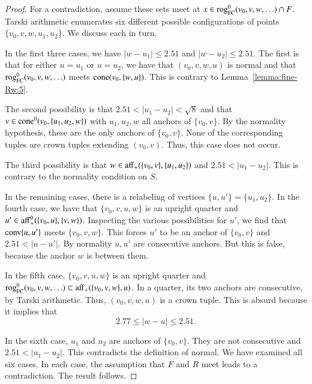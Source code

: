 \begin{proof}
For a contradiction, assume these sets meet at $x\in {\operatorname{rog}}^0_{\text{FC}}(v_0,v,w,\ldots)\cap F$.
Tarski arithmetic enumerates six different possible
configurations of points $\{v_0,v,w,u_1,u_2\}$.  We discuss each
in turn.

In the first three cases, 
%
we have $|w-u_1|\le 2.51$ and $|w-u_2|\le 2.51$.  The first is that
for either $u=u_1$ or $u=u_2$, we have that $(v_0,v,w,u)$ is normal
and that ${\operatorname{rog}}^0_{\text{FC}}(v_0,v,w,\ldots)$ meets ${\operatorname{cone}}(v_0,\{w,u\})$.  This is contrary to
Lemma~\ref{lemma:fine-Rw:5}.

The second possibility is that
$2.51<|u_1-u_2|<\sqrt8$ and that $v\in{\operatorname{cone}}^0(v_0,\{u_1,u_2,w\})$
with $u_1,u_2,w$ all anchors of $\{v_0,v\}$.  By the normality
hypothesis, these are the only anchors of $\{v_0,v\}$.  None of the
corresponding tuples are crown tuples extending
$(v_0,v)$.  Thus, this case does not
occur. 

The third possibility is that $w\in {\operatorname{aff}}_+(\{v_0,v\},\{u_1,u_2\})$
and $2.51<|u_1-u_2|$.  This is contrary to the normality
condition on $S$.

In the remaining cases, there is a 
relabeling of vertices $\{u,u'\}=\{u_1,u_2\}$.
In the fourth case, we have that $\{v_0,v,u,w\}$ is an upright
quarter and $u'\in {\operatorname{aff}}_+^0(\{v_0,u\},\{v,w\})$.  Inspecting
the various possibilities for $u'$, we find that
${\operatorname{conv}}\{u,u'\}$ meets $\{v_0,v,w\}$.  This forces $u'$ to be
an anchor of $\{v_0,v\}$ and $2.51 < |u-u'|$.  By normality
$u,u'$ are consecutive anchors.  But this is false, because the
anchor  $w$ is between them.

In the fifth case, $\{v_0,v,u,w\}$ is an upright quarter and
${\operatorname{rog}}^0_{\text{FC}}(v_0,v,w,\ldots)\subset {\operatorname{aff}}_+(\{v_0,v,w\},u)$.  
In a quarter, its two anchors are consecutive, by Tarski arithmetic.  Thus,
$(v_0,v,w,u)$ is a crown tuple.  This is absurd because it implies that
  $$
   2.77 \le |w-u| \le 2.51.
  $$

In the sixth case, $u_1$ and $u_2$ are anchors of $\{v_0,v\}$.
They are not consecutive and $2.51 < |u_1-u_2|$.  This contradicts
the definition of normal.
We have examined all six cases.  In each case, the assumption
that $F$ and $R$ meet leads to a contradiction.  The result follows.
\end{proof}

